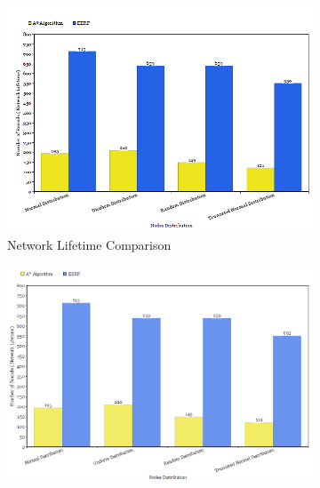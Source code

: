 \documentclass[a4paper]{article}
\begin{document}
\begin{figure}[H]
    \centering
    \begin{subfigure}[b]{0.47\textwidth}
         \centering
         \includegraphics[width=\textwidth]{img/bar_chart1.png}
         \caption{Network Lifetime Comparison }
         \label{fig:wsn_life}
    \end{subfigure}
    \hfill
    \begin{subfigure}[b]{0.47\textwidth}
        \centering
         \includegraphics[width=\textwidth]{img/bar_chart2.png}
         \caption{}
         \label{fig:wsn_runtime}
    \end{subfigure}
    \caption{}
    \label{fig:query_trend}
\end{figure}
\end{document}
